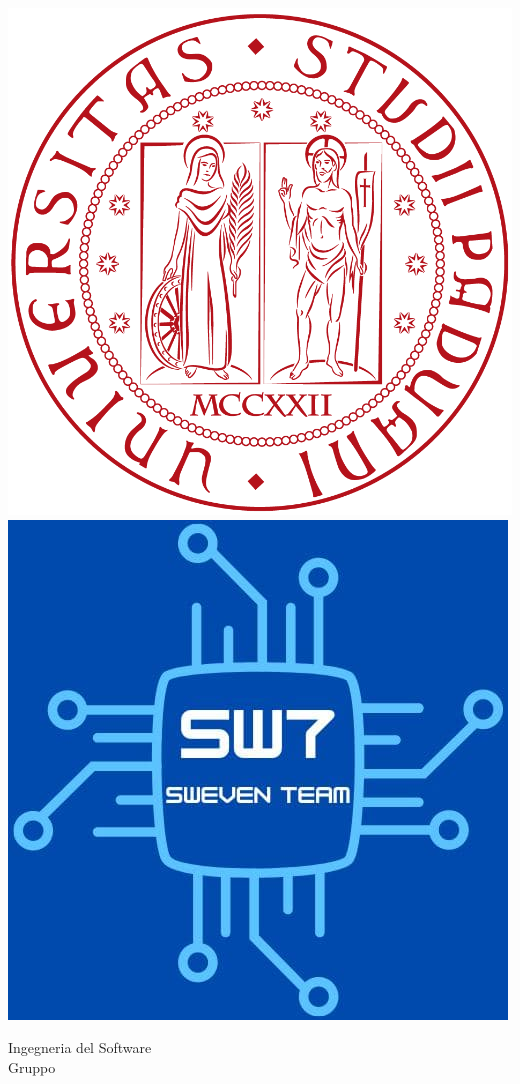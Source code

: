 
	\includegraphics[scale=0.10]{images/unipd.png}
	\hspace{24em}
	\includegraphics[scale=0.30]{images/logo.jpg} 
	\vspace{2em}
	\begin{flushleft}
		Ingegneria del Software			\\
		Gruppo \docNomeTeam
	\end{flushleft}							
	
